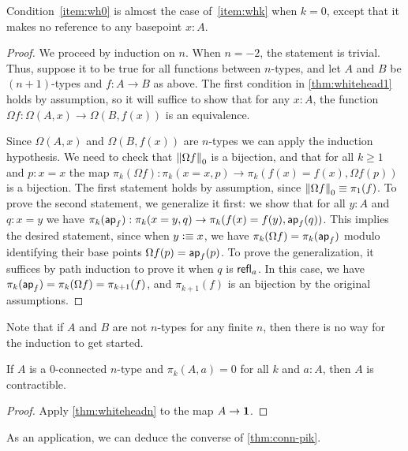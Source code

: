 \noindent
Condition~\ref{item:wh0} is almost the case of~\ref{item:whk} when $k=0$, except that it makes no reference to any basepoint $x:A$.

\begin{proof}
  We proceed by induction on $n$.
  When $n=-2$, the statement is trivial.
  Thus, suppose it to be true for all functions between $n$-types, and let $A$ and $B$ be $(n+1)$-types and $f:A\to B$ as above.
  The first condition in \cref{thm:whitehead1} holds by assumption, so it will suffice to show that for any $x:A$, the function $\Omega f: \Omega(A,x) \to \Omega(B,f(x))$ is an equivalence.

  Since $\Omega(A,x)$ and $\Omega(B,f(x))$ are $n$-types we can apply the induction hypothesis.
  We need to check that $\trunc 0{\Omega f}$ is a bijection, and that for all $k\geq1$ and $p : x = x$ the map $\pi_k(\Omega f):\pi_k(x = x,p) \to \pi_k(f(x) = f(x),\Omega f(p))$ is a bijection.
  The first statement holds by assumption, since $\trunc 0{\Omega f} \jdeq \pi_1(f)$.
  To prove the second statement, we generalize it first: we show that for all $y : A$ and $q : x = y$ we have $\pi_k(\apfunc f):\pi_k(x = y,q) \to \pi_k(f(x) = f(y),\apfunc f(q))$.
  This implies the desired statement, since when $y\defeq x$, we have $\pi_k(\Omega f)=\pi_k(\apfunc f)$ modulo identifying their base points $\Omega f(p)=\apfunc f(p)$.
  To prove the generalization, it suffices by path induction to prove it when $q$ is $\refl{a}$.
  In this case, we have $\pi_k(\apfunc f) = \pi_k(\Omega f) = \pi_{k+1}(f)$, and $\pi_{k+1}(f)$ is an bijection by the original assumptions.
\end{proof}

Note that if $A$ and $B$ are not $n$-types for any finite $n$, then there is no way for the induction to get started.

\begin{cor}\label{thm:whitehead-contr}
  If $A$ is a $0$-connected $n$-type and $\pi_k(A,a)=0$ for all $k$ and $a:A$, then $A$ is contractible.
\end{cor}
\begin{proof}
  Apply \cref{thm:whiteheadn} to the map $A\to\unit$.
\end{proof}

As an application, we can deduce the converse of \cref{thm:conn-pik}.

